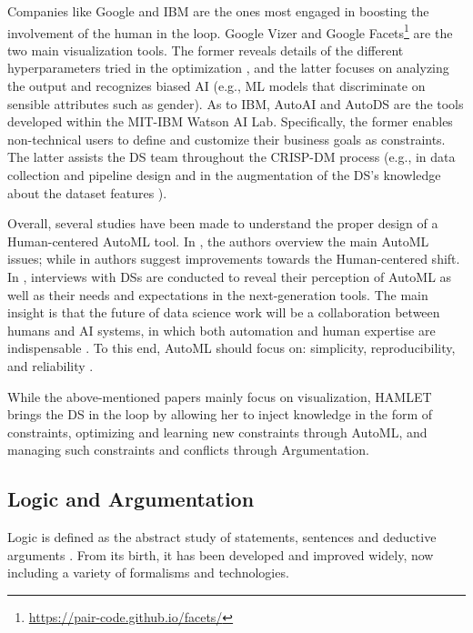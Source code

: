 Companies like Google and IBM are the ones most engaged in boosting the involvement of the human in the loop.
Google Vizer \cite{golovin2017google} and Google Facets\footnote{\url{https://pair-code.github.io/facets/}} are the two main visualization tools.
The former reveals details of the different hyperparameters tried in the optimization \cite{golovin2017google}, and the latter focuses on analyzing the output and recognizes biased AI (e.g., ML models that discriminate on sensible attributes such as gender).
As to IBM, AutoAI \cite{wang2020autoai} and AutoDS \cite{wang2021autods} are the tools developed within the MIT-IBM Watson AI Lab.
Specifically, the former enables non-technical users to define and customize their business goals as constraints. 
The latter assists the DS team throughout the CRISP-DM process (e.g., in data collection and pipeline design \cite{muller2019data, wang2021autods} and in the augmentation of the DS's knowledge about the dataset features \cite{drozdal2020trust}).

Overall, several studies have been made to understand the proper design of a Human-centered AutoML tool.
In \cite{pfisterer2019towards}, the authors overview the main AutoML issues; while in \cite{khuat2022roles} authors suggest improvements towards the Human-centered shift.
In \cite{gil2019towards, XinWLSP21automationml, crisan2021fits}, interviews with DSs are conducted to reveal their perception of AutoML as well as their needs and expectations in the next-generation tools.
The main insight is that the future of data science work will be a collaboration between humans and AI systems, in which both automation and human expertise are indispensable \cite{wang2019human}.
To this end, AutoML should focus on: simplicity, reproducibility, and reliability \cite{XinWLSP21automationml, crisan2021fits}.

While the above-mentioned papers mainly focus on visualization, HAMLET brings the DS in the loop by allowing her to inject knowledge in the form of constraints, optimizing and learning new constraints through AutoML, and managing such constraints and conflicts through Argumentation.

\subsection{Logic and Argumentation}\label{logic}
Logic is defined as the abstract study of statements, sentences and deductive arguments \cite{Paulson2018logichistory}.
From its birth, it has been developed and improved widely, now including a variety of formalisms and technologies.

